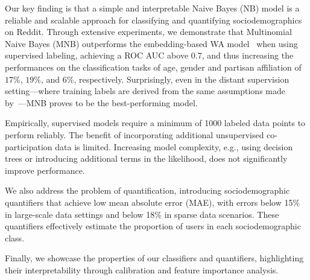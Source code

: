 Our key finding is that a simple and interpretable Naive Bayes (NB) model is a reliable and scalable approach for classifying and quantifying sociodemographics on Reddit.
Through extensive experiments, we demonstrate that Multinomial Naive Bayes (MNB) outperforms the embedding-based WA model~\citep{waller2021quantifying} when using supervised labeling, achieving a ROC AUC above $0.7$, and thus increasing the performances on the classification tasks of age, gender and partisan affiliation of $17\%$, $19\%$, and $6\%$, respectively. %
Surprisingly, even in the distant supervision setting---where training labels are derived from the same assumptions made by~\citet{waller2021quantifying}---MNB proves to be the best-performing model.

Empirically, supervised models require a minimum of \num{1000} labeled data points to perform reliably. 
The benefit of incorporating additional unsupervised co-participation data is limited.
Increasing model complexity, e.g., using decision trees or introducing additional terms in the likelihood, does not significantly improve performance.

We also address the problem of quantification, introducing sociodemographic quantifiers that achieve low mean absolute error (MAE), with errors below 15\% in large-scale data settings and below 18\% in sparse data scenarios. 
These quantifiers effectively estimate the proportion of users in each sociodemographic class.

Finally, we showcase the properties of our classifiers and quantifiers, highlighting their interpretability through calibration and feature importance analysis.











